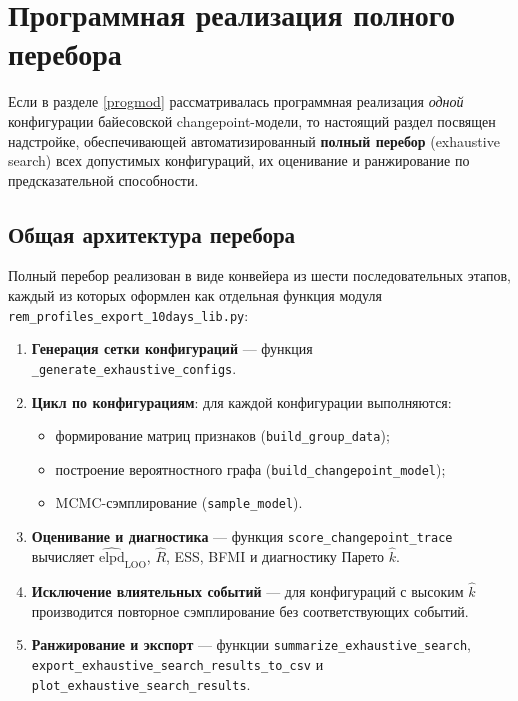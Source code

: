 \documentclass[14pt]{mmcs_article}
\begin{document}
\section{Программная реализация полного перебора}

Если в разделе \ref{progmod} рассматривалась программная
реализация \textit{одной} конфигурации байесовской
changepoint-модели, то настоящий раздел посвящен надстройке,
обеспечивающей автоматизированный \textbf{полный перебор}
(exhaustive search) всех допустимых конфигураций, их
оценивание и ранжирование по предсказательной способности.

\subsection*{Общая архитектура перебора}

Полный перебор реализован в виде конвейера из шести
последовательных этапов, каждый из которых оформлен как
отдельная функция модуля
\texttt{rem\_profiles\_export\_10days\_lib.py}:

\begin{enumerate}
	\item \textbf{Генерация сетки конфигураций} — функция\linebreak
	\texttt{\_generate\_exhaustive\_configs}.
	\item \textbf{Цикл по конфигурациям}: для каждой
	конфигурации выполняются:
	\begin{itemize}
		\item формирование матриц признаков
		(\texttt{build\_group\_data});
		\item построение вероятностного графа
		(\texttt{build\_changepoint\_model});
		\item MCMC-сэмплирование
		(\texttt{sample\_model}).
	\end{itemize}
	\item \textbf{Оценивание и диагностика} — функция
	\texttt{score\_changepoint\_trace} вычисляет
	$\widehat{\mathrm{elpd}}_{\mathrm{LOO}}$,
	$\hat{R}$, ESS, BFMI и диагностику Парето $\hat{k}$.
	\item \textbf{Исключение влиятельных событий} — для
	конфигураций с высоким $\hat{k}$ производится
	повторное сэмплирование без соответствующих событий.
	\item \textbf{Ранжирование и экспорт} — функции
	\texttt{summarize\_exhaustive\_search},
	\texttt{export\_exhaustive\_search\_results\_to\_csv}
	и \linebreak\texttt{plot\_exhaustive\_search\_results}.
\end{enumerate}
\end{document}
